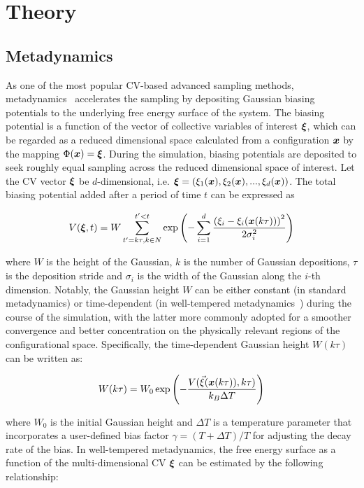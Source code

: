 \documentclass[journal=jacsat,manuscript=article]{achemso}
\newcommand{\bfv}[1]{{\mbox{\boldmath{$#1$}}}}
\newcommand{\x}{\bfv{x}}
\begin{document}
\section{Theory}
\subsection{Metadynamics}
As one of the most popular CV-based advanced sampling methods, metadynamics~\cite{metad} accelerates the sampling by depositing Gaussian biasing potentials to the underlying free energy surface of the system. The biasing potential is a function of the vector of collective variables of interest $\bfv{\xi}$, which can be regarded as a reduced dimensional space calculated from a configuration $\x$ by the mapping $\Phi(\x)=\bfv{\xi}$. During the simulation, biasing potentials are deposited to seek roughly equal sampling across the reduced dimensional space of interest. Let the CV vector $\bfv{\xi}$ be $d$-dimensional, i.e. $\bfv{\xi}=(\xi_{1}(\x), \xi_{2}(\x), ..., \xi_{d}(\x))$. The total biasing potential added after a period of time $t$ can be expressed as 

\begin{equation}
    V(\bfv{\xi}, t) = W \sum_{t'=k\tau, k \in N}^{t'<t}\exp \left( -\sum_{i=1}^{d}\frac{\left(\xi_{i}-\xi_{i}(\x (k\tau))\right)^{2}}{2\sigma_{i}^{2}}\right)
\end{equation}

where $W$ is the height of the Gaussian, $k$ is the number of Gaussian depositions, $\tau$ is the deposition stride and $\sigma_{i}$ is the width of the Gaussian along the $i$-th dimension. Notably, the Gaussian height $W$ can be either constant (in standard metadynamics) or time-dependent (in well-tempered metadynamics~\cite{WTMetaD}) during the course of the simulation, with the latter more commonly adopted for a smoother convergence and better concentration on the physically relevant regions of the configurational space. Specifically, the time-dependent Gaussian height $W(k\tau)$ can be written as:

\begin{equation}
    W(k\tau)=W_{0}\exp \left(-\frac{V(\vec{\xi}(\x(k\tau)), k\tau)}{k_{B}\Delta T} \right)
\end{equation}

where $W_0$ is the initial Gaussian height and $\Delta T$ is a temperature parameter that incorporates a user-defined bias factor $\gamma=(T + \Delta T)/T$ for adjusting the decay rate of the bias. In well-tempered metadynamics, the free energy surface as a function of the multi-dimensional CV $\bfv{\xi}$ can be estimated by the following relationship:
\end{document}
